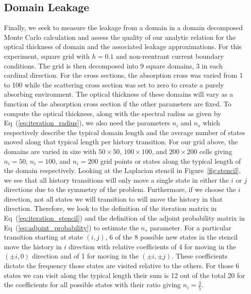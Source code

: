 \documentclass{mc2013}
\begin{document}
\subsection{Domain Leakage}
\label{subsec:domain_leakage}

Finally, we seek to measure the leakage from a domain in a domain
decomposed Monte Carlo calculation and assess the quality of our
analytic relation for the optical thickness of domain and the
associated leakage approximations. For this experiment, square grid
with $h=0.1$ and non-reentrant current boundary conditions. The grid
is then decomposed into 9 square domains, 3 in each cardinal
direction. For the cross sections, the absorption cross was varied
from 1 to 100 while the scattering cross section was set to zero to
create a purely absorbing environment. The optical thickness of these
domains will vary as a function of the absorption cross section if the
other parameters are fixed. To compute the optical thickness, along
with the spectral radius as given by Eq~(\ref{eq:iteration_radius}),
we also need the parameters $n_i$ and $n_s$ which respectively
describe the typical domain length and the average number of states
moved along that typical length per history transition. For our grid
above, the domains are varied in size with $50 \times 50$, $100 \times
100$, and $200 \times 200$ cells giving $n_i=50$, $n_i=100$, and
$n_i=200$ grid points or states along the typical length of the domain
respectively. Looking at the Laplacian stencil in
Figure~\ref{fig:stencil}, we see that all history transitions will
only move a single state in either the $i$ or $j$ directions due to
the symmetry of the problem. Furthermore, if we choose the $i$
direction, not all states we will transition to will move the history
in that direction. Therefore, we look to the definition of the
iteration matrix in Eq~(\ref{eq:iteration_stencil}) and the definition
of the adjoint probability matrix in Eq~(\ref{eq:adjoint_probability})
to estimate the $n_s$ parameter. For a particular transition starting
at state $(i,j)$, 6 of the 8 possible new states in the stencil move
the history in $i$ direction with relative coefficients of 4 for
moving in the $(\pm i,0)$ direction and of 1 for moving in the $(\pm
i,\pm j)$. These coefficients dictate the frequency those states are
visited relative to the others. For those 6 states we can visit along
the typical length their sum is 12 out of the total 20 for the
coefficients for all possible states with their ratio giving $n_i =
\frac{3}{5}$.
\end{document}
